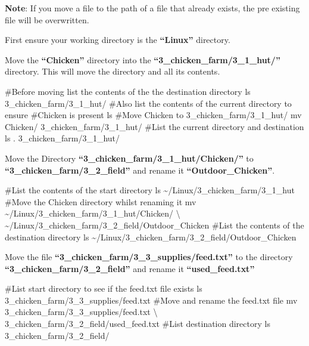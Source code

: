 \documentclass[
  letterpaper,
  DIV=11,
  numbers=noendperiod]{scrreprt}
\newenvironment{Shaded}{\begin{snugshade}}{\end{snugshade}}
\newcommand{\CommentTok}[1]{\textcolor[rgb]{0.37,0.37,0.37}{#1}}
\newcommand{\DataTypeTok}[1]{\textcolor[rgb]{0.68,0.00,0.00}{#1}}
\newcommand{\FunctionTok}[1]{\textcolor[rgb]{0.28,0.35,0.67}{#1}}
\newcommand{\NormalTok}[1]{\textcolor[rgb]{0.00,0.23,0.31}{#1}}
\begin{document}
\textbf{Note}: If you move a file to the path of a file that already
exists, the pre existing file will be overwritten.

First ensure your working directory is the \textbf{``Linux''} directory.

Move the \textbf{``Chicken''} directory into the
\textbf{``3\_chicken\_farm/3\_1\_hut/''} directory. This will move the
directory and all its contents.

\begin{Shaded}
\begin{Highlighting}[]
\CommentTok{\#Before moving list the contents of the the destination directory}
\FunctionTok{ls}\NormalTok{ 3\_chicken\_farm/3\_1\_hut/}
\CommentTok{\#Also list the contents of the current directory to ensure }
\CommentTok{\#Chicken is present}
\FunctionTok{ls}
\CommentTok{\#Move Chicken to 3\_chicken\_farm/3\_1\_hut/}
\FunctionTok{mv}\NormalTok{ Chicken/ 3\_chicken\_farm/3\_1\_hut/}
\CommentTok{\#List the current directory and destination}
\FunctionTok{ls}\NormalTok{ . 3\_chicken\_farm/3\_1\_hut/}
\end{Highlighting}
\end{Shaded}

Move the Directory \textbf{``3\_chicken\_farm/3\_1\_hut/Chicken/''} to
\textbf{``3\_chicken\_farm/3\_2\_field''} and rename it
\textbf{``Outdoor\_Chicken''}.

\begin{Shaded}
\begin{Highlighting}[]
\CommentTok{\#List the contents of the start directory}
\FunctionTok{ls}\NormalTok{ \textasciitilde{}/Linux/3\_chicken\_farm/3\_1\_hut}
\CommentTok{\#Move the Chicken directory whilst renaming it}
\FunctionTok{mv}\NormalTok{ \textasciitilde{}/Linux/3\_chicken\_farm/3\_1\_hut/Chicken/ }\DataTypeTok{\textbackslash{}}
\NormalTok{\textasciitilde{}/Linux/3\_chicken\_farm/3\_2\_field/Outdoor\_Chicken}
\CommentTok{\#List the contents of the destination directory}
\FunctionTok{ls}\NormalTok{ \textasciitilde{}/Linux/3\_chicken\_farm/3\_2\_field/Outdoor\_Chicken}
\end{Highlighting}
\end{Shaded}

Move the file \textbf{``3\_chicken\_farm/3\_3\_supplies/feed.txt''} to
the directory \textbf{``3\_chicken\_farm/3\_2\_field''} and rename it
\textbf{``used\_feed.txt''}

\begin{Shaded}
\begin{Highlighting}[]
\CommentTok{\#List start directory to see if the feed.txt file exists}
\FunctionTok{ls}\NormalTok{ 3\_chicken\_farm/3\_3\_supplies/feed.txt}
\CommentTok{\#Move and rename the feed.txt file}
\FunctionTok{mv}\NormalTok{ 3\_chicken\_farm/3\_3\_supplies/feed.txt }\DataTypeTok{\textbackslash{}}
\NormalTok{3\_chicken\_farm/3\_2\_field/used\_feed.txt}
\CommentTok{\#List destination directory}
\FunctionTok{ls}\NormalTok{ 3\_chicken\_farm/3\_2\_field/}
\end{Highlighting}
\end{Shaded}
\end{document}
